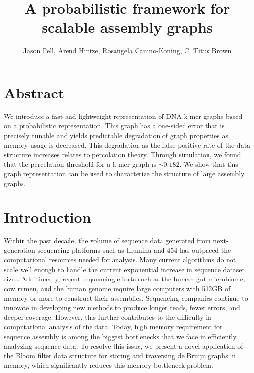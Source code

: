 \documentclass[12pt]{article} \usepackage{simplemargins}
\begin{document}
\title{A probabilistic framework for scalable assembly graphs}
\author{Jason Pell, Arend Hintze, Rosangela Canino-Koning, C. Titus Brown}

\maketitle

\section{Abstract}

We introduce a fast and lightweight representation of DNA k-mer graphs
based on a probabilistic representation.  This graph has a one-sided
error that is precisely tunable and yields predictable degradation of
graph properties as memory usage is decreased. This degradation as the false 
positive rate of the data structure increases relates to percolation theory. Through 
simulation, we found that the percolation threshold for a k-mer graph 
is $\sim 0.182$. We show that this
graph representation can be used to characterize the structure of
large assembly graphs.

\section{Introduction}

Within the past decade, the volume of sequence data generated
from next-generation sequencing platforms such as Illumina and 454
has outpaced the computational resources needed for
analysis. Many current algorithms do not scale well
enough to handle the current exponential increase in sequence dataset
sizes. Additionally, recent sequencing efforts such as the human gut
microbiome\cite{pmid20203603}, cow rumen\cite{pmid21273488}, and the 
human genome\cite{pmid21187386} require large computers with 512GB of memory
or more to construct their
assemblies. Sequencing companies continue to innovate in developing new 
methods to produce longer reads, fewer errors, 
and deeper coverage. However, this further contributes to the difficulty in computational 
analysis of the data. Today, high memory requirement for sequence assembly is
among the biggest bottlenecks that we face in efficiently analyzing
sequence data. To resolve this issue, we present a novel application
of the Bloom filter data structure\cite{bloom} for storing and traversing de
Bruijn graphs in memory, which significantly reduces this
memory bottleneck problem.
\end{document}
